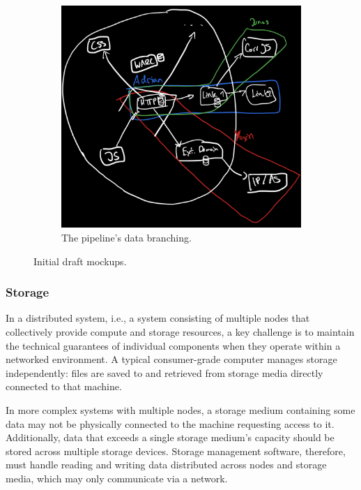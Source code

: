 \begin{figure}[H]
\begin{subfigure}{0.45\textwidth}
      \includegraphics[width=\linewidth]{figures/approach-layered.png}
      \caption{The pipeline's data branching.}
      \label{fig:design-intuitive-approach-branching}
    \end{subfigure}
    \caption{Initial draft mockups.}
    \label{fig:design-intuitive-approach}
\end{figure}


\subsubsection{Storage}
\label{sec:design-storage}

In a distributed system, i.e., a system consisting of multiple nodes that collectively provide compute and storage resources, a key challenge is to maintain the technical guarantees of individual components when they operate within a networked environment.
A typical consumer-grade computer manages storage independently: files are saved to and retrieved from storage media directly connected to that machine.

In more complex systems with multiple nodes, a storage medium containing some data may not be physically connected to the machine requesting access to it.
Additionally, data that exceeds a single storage medium's capacity should be stored across multiple storage devices.
Storage management software, therefore, must handle reading and writing data distributed across nodes and storage media, which may only communicate via a network.

